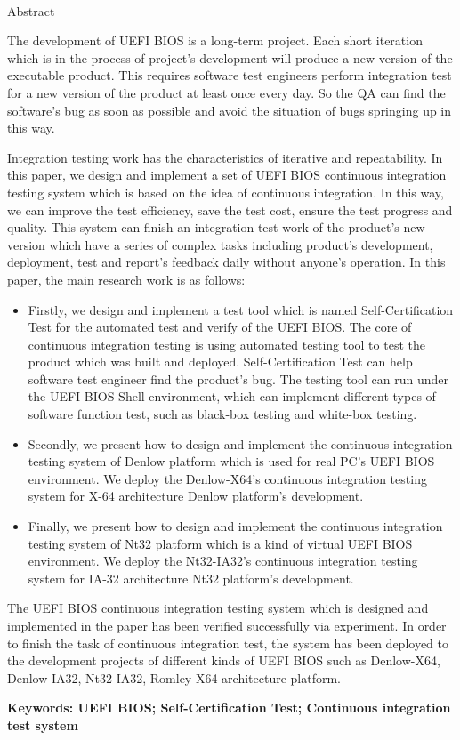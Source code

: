 \newpage

\begin{center}
  {\sanhao[1.5]\heiti\oucetitle\\\vskip7pt Abstract}
\end{center}
{\normalsize\songti

  The development of UEFI BIOS is a long-term project. Each short iteration which is in the process of project's development will produce a new version of the executable product. This requires software test engineers perform integration test for a new version of the product at least once every day. So the QA can find the software's bug as soon as possible and avoid the situation of bugs springing up in this way. 

  Integration testing work has the characteristics of iterative and repeatability. In this paper, we design and implement a set of UEFI BIOS continuous integration testing system which is based on the idea of continuous integration. In this way, we can improve the test efficiency, save the test cost, ensure the test progress and quality. This system can finish an integration test work of the product's new version which have a series of complex tasks including product's development, deployment, test and report's feedback daily without anyone's operation. In this paper, the main research work is as follows:
  \begin{itemize}
    \item Firstly, we design and implement a test tool which is named Self-Certification Test for the automated test and verify of the UEFI BIOS. The core of continuous integration testing is using automated testing tool to test the product which was built and deployed. Self-Certification Test can help software test engineer find the product's bug. The testing tool can run under the UEFI BIOS Shell environment, which can implement different types of software function test, such as black-box testing and white-box testing.
	\item Secondly, we present how to design and implement the continuous integration testing system of Denlow platform which is used for real PC's UEFI BIOS environment. We deploy the Denlow-X64's continuous integration testing system for X-64 architecture Denlow platform's development.
	\item Finally, we present how to design and implement the continuous integration testing system of Nt32 platform which is a kind of virtual UEFI BIOS environment. We deploy the Nt32-IA32's continuous integration testing system for IA-32 architecture Nt32 platform's development.
  \end{itemize}
  
  The UEFI BIOS continuous integration testing system which is designed and implemented in the paper has been verified successfully via experiment. In order to finish the task of continuous integration test, the system has been deployed to the development projects of different kinds of UEFI BIOS such as Denlow-X64, Denlow-IA32, Nt32-IA32, Romley-X64 architecture platform.
}
\vskip12bp
{\xiaosi\heiti\noindent 
\textbf{Keywords: UEFI BIOS; Self-Certification Test; Continuous integration test system}}
